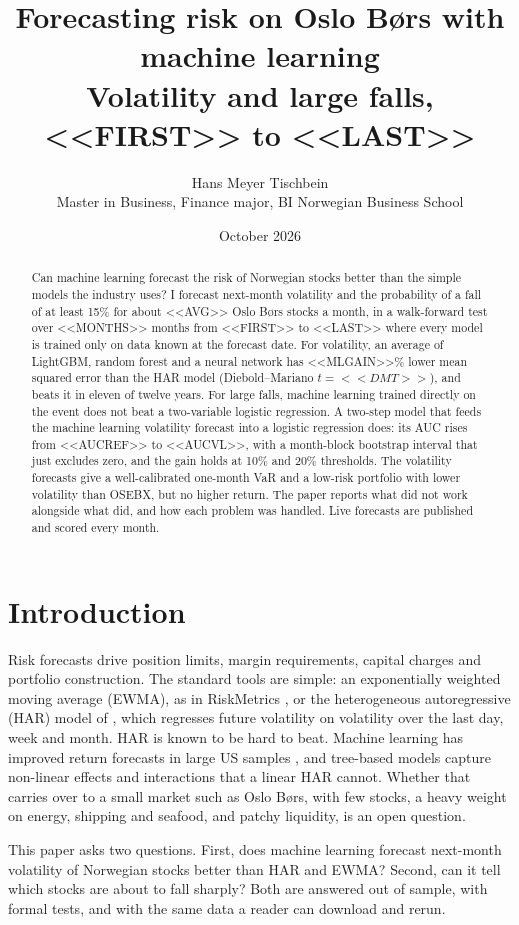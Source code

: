 \documentclass[11pt,a4paper]{article}
\title{\textbf{Forecasting risk on Oslo Børs with machine learning}\\[0.3em]\large Volatility and large falls, <<FIRST>> to <<LAST>>}
\author{Hans Meyer Tischbein\\\small Master in Business, Finance major, BI Norwegian Business School}
\date{October 2026}
\begin{document}
\maketitle

\begin{abstract}
\noindent Can machine learning forecast the risk of Norwegian stocks better than the simple models the industry uses? I forecast next-month volatility and the probability of a fall of at least 15\% for about <<AVG>> Oslo Børs stocks a month, in a walk-forward test over <<MONTHS>> months from <<FIRST>> to <<LAST>> where every model is trained only on data known at the forecast date. For volatility, an average of LightGBM, random forest and a neural network has <<MLGAIN>>\% lower mean squared error than the HAR model (Diebold--Mariano $t=<<DMT>>$), and beats it in eleven of twelve years. For large falls, machine learning trained directly on the event does not beat a two-variable logistic regression. A two-step model that feeds the machine learning volatility forecast into a logistic regression does: its AUC rises from <<AUCREF>> to <<AUCVL>>, with a month-block bootstrap interval that just excludes zero, and the gain holds at 10\% and 20\% thresholds. The volatility forecasts give a well-calibrated one-month VaR and a low-risk portfolio with lower volatility than OSEBX, but no higher return. The paper reports what did not work alongside what did, and how each problem was handled. Live forecasts are published and scored every month.
\end{abstract}

\section{Introduction}
Risk forecasts drive position limits, margin requirements, capital charges and portfolio construction. The standard tools are simple: an exponentially weighted moving average (EWMA), as in RiskMetrics \citep{riskmetrics1996}, or the heterogeneous autoregressive (HAR) model of \citet{corsi2009}, which regresses future volatility on volatility over the last day, week and month. HAR is known to be hard to beat. Machine learning has improved return forecasts in large US samples \citep{gu2020}, and tree-based models capture non-linear effects and interactions that a linear HAR cannot. Whether that carries over to a small market such as Oslo Børs, with few stocks, a heavy weight on energy, shipping and seafood, and patchy liquidity, is an open question.

This paper asks two questions. First, does machine learning forecast next-month volatility of Norwegian stocks better than HAR and EWMA? Second, can it tell which stocks are about to fall sharply? Both are answered out of sample, with formal tests, and with the same data a reader can download and rerun.
\end{document}
